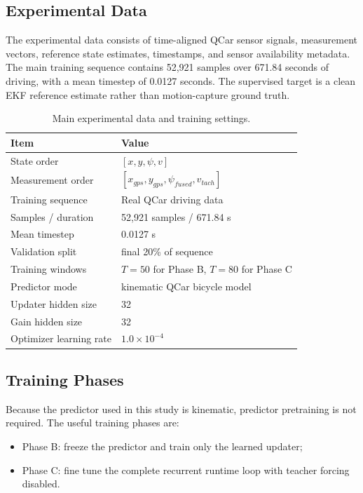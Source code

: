 \documentclass[11pt,a4paper]{article}
\begin{document}
\subsection{Experimental Data}

The experimental data consists of time-aligned QCar sensor signals, measurement
vectors, reference state estimates, timestamps, and sensor availability
metadata. The main training sequence contains 52,921 samples over 671.84
seconds of driving, with a mean timestep of 0.0127 seconds. The supervised
target is a clean EKF reference estimate rather than motion-capture ground
truth.

\begin{table}[htbp]
\centering
\caption{Main experimental data and training settings.}
\label{tab:dataset}
\begin{tabular}{ll}
\toprule
Item & Value \\
\midrule
State order & $[x,y,\psi,v]$ \\
Measurement order & $[x_{gps},y_{gps},\psi_{fused},v_{tach}]$ \\
Training sequence & Real QCar driving data \\
Samples / duration & 52,921 samples / 671.84 s \\
Mean timestep & 0.0127 s \\
Validation split & final 20\% of sequence \\
Training windows & $T=50$ for Phase B, $T=80$ for Phase C \\
Predictor mode & kinematic QCar bicycle model \\
Updater hidden size & 32 \\
Gain hidden size & 32 \\
Optimizer learning rate & $1.0\times10^{-4}$ \\
\bottomrule
\end{tabular}
\end{table}

\subsection{Training Phases}

Because the predictor used in this study is kinematic, predictor pretraining is
not required. The useful training phases are:
\begin{itemize}
  \item Phase B: freeze the predictor and train only the learned updater;
  \item Phase C: fine tune the complete recurrent runtime loop with teacher
  forcing disabled.
\end{itemize}
\end{document}
